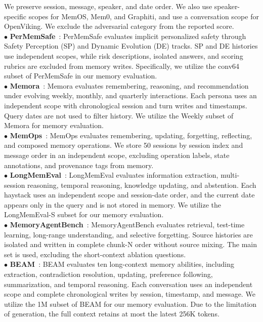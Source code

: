 We preserve session, message, speaker, and date order.
We also use speaker-specific scopes for MemOS, Mem0, and Graphiti, and use a conversation scope for OpenViking.
We exclude the adversarial category from the reported score.\\
$\bullet$ \textbf{PerMemSafe}~\cite{an2026permemsafe}: PerMemSafe evaluates implicit personalized safety through Safety Perception (SP) and Dynamic Evolution (DE) tracks.
SP and DE histories use independent scopes, while risk descriptions, isolated answers, and scoring rubrics are excluded from memory writes.
Specifically, we utilize the conv64 subset of PerMemSafe in our memory evaluation.\\
$\bullet$ \textbf{Memora}~\cite{uddin2026recall}: Memora evaluates remembering, reasoning, and recommendation under evolving weekly, monthly, and quarterly interactions.
Each persona uses an independent scope with chronological session and turn writes and timestamps.
Query dates are not used to filter history.
We utilize the Weekly subset of Memora for memory evaluation.\\
$\bullet$ \textbf{MemOps}~\cite{hao2026memops}: MemOps evaluates remembering, updating, forgetting, reflecting, and composed memory operations. We store 50 sessions by session index and message order in an independent scope, excluding operation labels, state annotations, and provenance tags from memory. \\
$\bullet$ \textbf{LongMemEval}~\cite{wu2024longmemeval}: LongMemEval evaluates information extraction, multi-session reasoning, temporal reasoning, knowledge updating, and abstention.
Each haystack uses an independent scope and session-date order, and the current date appears only in the query and is not stored in memory.
We utilize the LongMemEval-S subset for our memory evaluation.\\
$\bullet$ \textbf{MemoryAgentBench}~\cite{hu2026evaluating}: MemoryAgentBench evaluates retrieval, test-time learning, long-range understanding, and selective forgetting.
Source histories are isolated and written in complete chunk-N order without source mixing.
The main set is used, excluding the short-context ablation questions.\\
$\bullet$ \textbf{BEAM}~\cite{tavakoli2025beyond}:
BEAM evaluates ten long-context memory abilities, including extraction, contradiction resolution, updating, preference following, summarization, and temporal reasoning.
Each conversation uses an independent scope and complete chronological writes by session, timestamp, and message.
We utilize the 1M subset of BEAM for our memory evaluation.
Due to the limitation of generation, the full context retains at most the latest 256K tokens.

